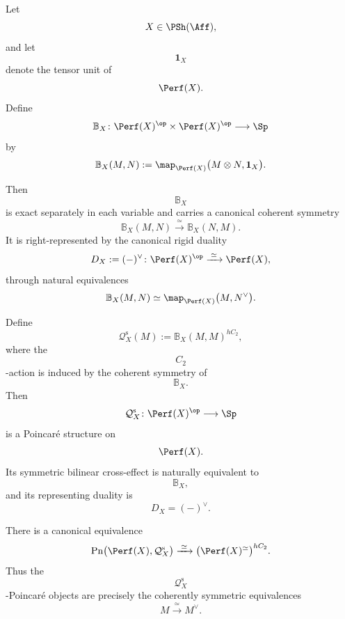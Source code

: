 \begin{proposition}
\label{prop:canonical-poincare-perfect-presheaves}
Let
\[
    X\in\PSh(\Aff),
\]
and let
\[
    \mathbf 1_X
\]
denote the tensor unit of
\[
    \Perf(X).
\]
Define
\[
    \mathbb B_X
    \colon
    \Perf(X)^{\op}
    \times
    \Perf(X)^{\op}
    \longrightarrow
    \Sp
\]
by
\[
    \mathbb B_X(M,N)
    :=
    \map_{\Perf(X)}
    \bigl(
        M\otimes N,
        \mathbf 1_X
    \bigr).
\]

Then
\[
    \mathbb B_X
\]
is exact separately in each variable and carries a canonical coherent
symmetry
\[
    \mathbb B_X(M,N)
    \xrightarrow{\;\simeq\;}
    \mathbb B_X(N,M).
\]
It is right-represented by the canonical rigid duality
\[
    D_X
    :=
    (-)^\vee
    \colon
    \Perf(X)^{\op}
    \xrightarrow{\;\simeq\;}
    \Perf(X),
\]
through natural equivalences
\[
    \mathbb B_X(M,N)
    \simeq
    \map_{\Perf(X)}
    \bigl(
        M,
        N^\vee
    \bigr).
\]

Define
\[
    \mathcal Q_X^{\mathrm s}(M)
    :=
    \mathbb B_X(M,M)^{hC_2},
\]
where the
\[
    C_2
\]
-action is induced by the coherent symmetry of
\[
    \mathbb B_X.
\]
Then
\[
    \mathcal Q_X^{\mathrm s}
    \colon
    \Perf(X)^{\op}
    \longrightarrow
    \Sp
\]
is a Poincar\'e structure on
\[
    \Perf(X).
\]
Its symmetric bilinear cross-effect is naturally equivalent to
\[
    \mathbb B_X,
\]
and its representing duality is
\[
    D_X=(-)^\vee.
\]

There is a canonical equivalence
\[
    \operatorname{Pn}
    \bigl(
        \Perf(X),
        \mathcal Q_X^{\mathrm s}
    \bigr)
    \xrightarrow{\;\simeq\;}
    \bigl(
        \Perf(X)^\simeq
    \bigr)^{hC_2}.
\]
Thus the
\[
    \mathcal Q_X^{\mathrm s}
\]
-Poincar\'e objects are precisely the coherently symmetric equivalences
\[
    M
    \xrightarrow{\;\simeq\;}
    M^\vee.
\]

\end{proposition}

